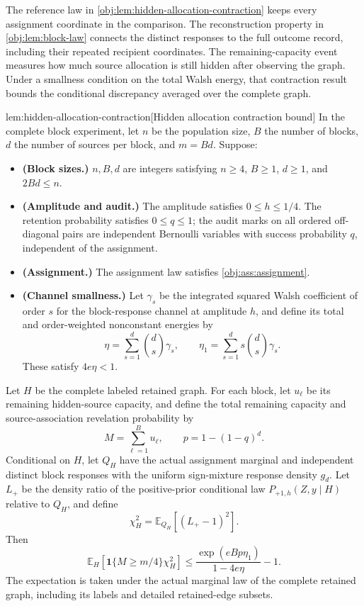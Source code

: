 \documentclass[11pt]{article}
\begin{document}
The reference law in \cref{obj:lem:hidden-allocation-contraction} keeps every assignment coordinate in the comparison. The reconstruction property in \cref{obj:lem:block-law} connects the distinct responses to the full outcome record, including their repeated recipient coordinates. The remaining-capacity event measures how much source allocation is still hidden after observing the graph. Under a smallness condition on the total Walsh energy, that contraction result bounds the conditional discrepancy averaged over the complete graph.

\begin{lemmav}{lem:hidden-allocation-contraction}[Hidden allocation contraction bound]
In the complete block experiment, let \(n\) be the population size, \(B\) the number of blocks, \(d\) the number of sources per block, and \(m=Bd\). Suppose:
\begin{itemize}
\item \textbf{(Block sizes.)} \(n,B,d\) are integers satisfying \(n\ge4\), \(B\ge1\), \(d\ge1\), and \(2Bd\le n\).
\item \textbf{(Amplitude and audit.)} The amplitude satisfies \(0\le h\le1/4\). The retention probability satisfies \(0\le q\le1\); the audit marks on all ordered off-diagonal pairs are independent Bernoulli variables with success probability \(q\), independent of the assignment.
\item \textbf{(Assignment.)} The assignment law satisfies \cref{obj:ass:assignment}.
\item \textbf{(Channel smallness.)} Let \(\gamma_s\) be the integrated squared Walsh coefficient of order \(s\) for the block-response channel at amplitude \(h\), and define its total and order-weighted nonconstant energies by
\[
\eta=\sum_{s=1}^{d}\binom{d}{s}\gamma_s,
\qquad
\eta_1=\sum_{s=1}^{d}s\binom{d}{s}\gamma_s.
\]
These satisfy \(4e\eta<1\).
\end{itemize}
Let \(H\) be the complete labeled retained graph. For each block, let \(u_\ell\) be its remaining hidden-source capacity, and define the total remaining capacity and source-association revelation probability by
\[
M=\sum_{\ell=1}^{B}u_\ell,
\qquad
p=1-(1-q)^d.
\]
Conditional on \(H\), let \(Q_H\) have the actual assignment marginal and independent distinct block responses with the uniform sign-mixture response density \(g_d\). Let \(L_+\) be the density ratio of the positive-prior conditional law \(P_{+1,h}(Z,y\mid H)\) relative to \(Q_H\), and define
\[
\chi_H^2=\mathbb E_{Q_H}\!\left[(L_+-1)^2\right].
\]
Then
\[
\mathbb E_H\!\left[\mathbf1\{M\ge m/4\}\chi_H^2\right]
\le
\frac{\exp(eBp\eta_1)}{1-4e\eta}-1.
\]
The expectation is taken under the actual marginal law of the complete retained graph, including its labels and detailed retained-edge subsets.
\end{lemmav}
\end{document}
